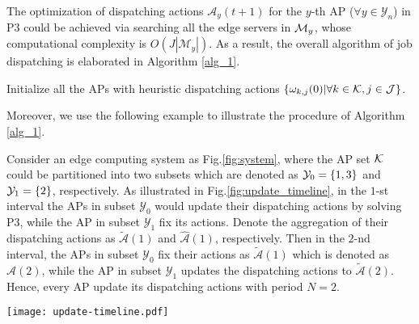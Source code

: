The optimization of {dispatching actions $\mathcal{A}_{y}(t+1)$} for the $y$-th AP ($\forall y\in\mathcal{Y}_{n}$) in P3 could be achieved via searching all the edge servers in $\mathcal{M}_{y}$, {whose computational complexity is $O(J|\mathcal{M}_{y}|)$}.
As a result, the overall algorithm of job dispatching is elaborated in Algorithm \ref{alg_1}.
\begin{algorithm}[ht]
    \caption{\algname: Online Alternative Actions Update Algorithm}\label{alg_1}
    \DontPrintSemicolon %
    Initialize all the APs with heuristic dispatching actions $\{{\omega}_{k,j}(0)|\forall k\in\mathcal{K},j\in\mathcal{J}\}$.\;
\end{algorithm}
Moreover, we use the following example to illustrate the procedure of Algorithm \ref{alg_1}.
\begin{example}
    \label{exp:update}
    Consider an edge computing system as Fig.\ref{fig:system}, where the AP set $\mathcal{K}$ could be partitioned into two subsets which are denoted as $\mathcal{Y}_{0} = \{1,3\}$ and $\mathcal{Y}_{1} = \{2\}$, respectively.
    As illustrated in Fig.\ref{fig:update_timeline}, in the $1$-st interval the APs in subset $\mathcal{Y}_{0}$ would update their dispatching actions by solving P3, while the AP in subset $\mathcal{Y}_{1}$ fix its actions.
    Denote the aggregation of their dispatching actions as $\tilde{\mathcal{A}}(1)$ and $\hat{\mathcal{A}}(1)$, respectively.
    Then in the $2$-nd interval, the APs in subset $\mathcal{Y}_{0}$ fix their actions as $\tilde{\mathcal{A}}(1)$ which is denoted as $\hat{\mathcal{A}}(2)$, while 
    the AP in subset $\mathcal{Y}_{1}$ updates the dispatching actions to $\tilde{\mathcal{A}}(2)$.
    Hence, every AP update its dispatching actions with period $N=2$.
    \begin{figure*}[htp!]
        \centering
        \texttt{[image: update-timeline.pdf]}
        \caption{The Illustration of Example \ref{exp:update}.}
        \label{fig:update_timeline}
    \end{figure*}
\end{example}

